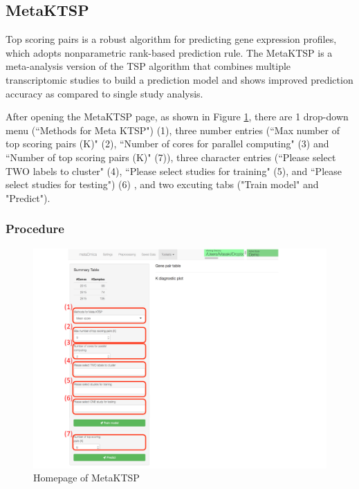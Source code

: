 \subsection{MetaKTSP}

Top scoring pairs is a robust algorithm for predicting gene expression profiles,
which adopts nonparametric rank-based prediction rule.
The MetaKTSP is a meta-analysis version of the TSP algorithm that combines multiple transcriptomic studies to build a prediction model and shows improved 
prediction accuracy as compared to single study analysis.

After opening the MetaKTSP page, as shown in Figure \ref{fig:MetaKTSPmainpage}, there are 1 drop-down menu (``Methods for Meta KTSP") {\color{red} (1)}, three number entries (``Max number of top scoring pairs (K)" {\color{red} (2)}, ``Number of cores for parallel computing" {\color{red} (3)} and ``Number of top scoring pairs (K)" {\color{red} (7)}), three character entries (``Please select TWO labels to cluster" {\color{red} (4)}, ``Please select studies for training" {\color{red} (5)}, and ``Please select studies for testing") {\color{red} (6)} , and two excuting tabs ("Train model" and "Predict"). 

\subsubsection{Procedure}

\begin{figure}[H]
\begin{center}
\includegraphics[scale=0.4]{./figure/MetaKTSP/metaKTSPprocedure}
\caption{Homepage of MetaKTSP}
\label{fig:MetaKTSPmainpage}
\end{center}
\end{figure}

